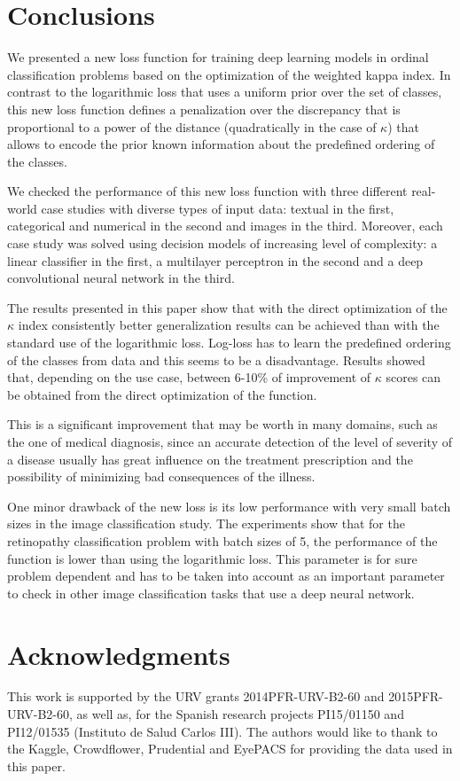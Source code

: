 \documentclass[times,twocolumn,final,authoryear]{elsarticle}
\begin{document}
\section{Conclusions}

We presented a new loss function for training deep learning models in ordinal classification problems based on the optimization of the weighted kappa index. In contrast to the logarithmic loss that uses a uniform prior over the set of classes, this new loss function defines a penalization over the discrepancy that is proportional to a power of the distance (quadratically in the case of $\kappa$) that allows to encode the prior known information about the predefined ordering of the classes. 

We checked the performance of this new loss function with three different real-world case studies with diverse types of input data: textual in the first, categorical and numerical in the second and images in the third. Moreover, each case study was solved using decision models of increasing level of complexity: a linear classifier in the first, a multilayer perceptron in the second and a deep convolutional neural network in the third. 

The results presented in this paper show that with the direct optimization of the $\kappa$ index consistently better generalization results can be achieved than with the standard use of the logarithmic loss. Log-loss has to learn the predefined ordering of the classes from data and this seems to be a disadvantage. Results showed that, depending on the use case, between 6-10\% of improvement of $\kappa$ scores can be obtained from the direct optimization of the function.

This is a significant improvement that may be worth in many domains, such as the one of medical diagnosis, since an accurate detection of the level of severity of a disease usually has great influence on the treatment prescription and the possibility of minimizing bad consequences of the illness.

One minor drawback of the new loss is its low performance with very small batch sizes in the image classification study. The experiments show that for the retinopathy classification problem with batch sizes of 5, the performance of the function is lower than using the logarithmic loss. This parameter is for sure problem dependent and has to be taken into account as an important parameter to check in other image classification tasks that use a deep neural network.




\section*{Acknowledgments}
This work is supported by the URV grants 2014PFR-URV-B2-60 and 2015PFR-URV-B2-60, as well as, for the Spanish research projects PI15/01150 and PI12/01535 (Instituto de Salud Carlos III). The authors would like to thank to the Kaggle, Crowdflower, Prudential and EyePACS for providing the data used in this paper.


%


\end{document}
